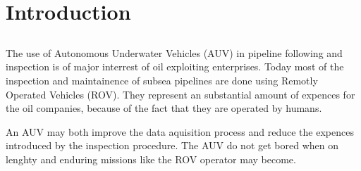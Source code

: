 \chapter{Introduction}

\section{}
	The use of Autonomous Underwater Vehicles (AUV) in pipeline following and inspection is of major interrest of oil exploiting enterprises. Today most of the inspection and maintainence of subsea pipelines are done using Remotly Operated Vehicles (ROV). They represent an substantial amount of expences for the oil companies, because of the fact that they are operated by humans. 
	
	An AUV may both improve the data aquisition process and reduce the expences introduced by the inspection procedure. The AUV do not get bored when on lenghty and enduring missions like the ROV operator may become. 
	